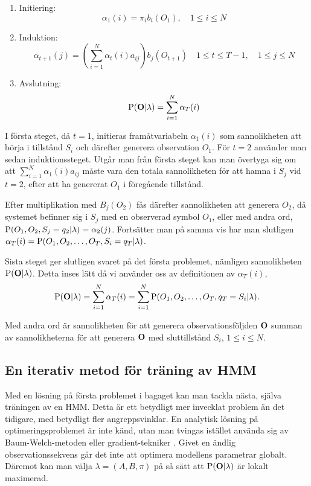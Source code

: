 \documentclass[../rapport_MVEX01-11-05]{subfiles}
\begin{document}
\begin{enumerate}
\item Initiering:
\begin{equation*}
\alpha_1(i) = \pi_ib_i(O_1), \quad 1\leq i \leq N
\end{equation*}

\item Induktion:
\begin{equation*}
\alpha_{t+1}(j) =
\left(\sum_{i=1}^N\alpha_t(i)a_{ij}\right)b_j(O_{t+1}) \quad 1 \leq t \leq T-1,\quad1 \leq j \leq N
\end{equation*}

\item Avslutning:
\begin{equation*}
\mathrm{P}(\mathbf{O}|\lambda) = \sum_{i=1}^N\alpha_T(i)
\end{equation*}
\end{enumerate}

I första steget, då $t=1$, initieras framåtvariabeln $\alpha_1(i)$ som
sannolikheten att börja i tillstånd $S_i$ och därefter generera
observation $O_1$. För $t=2$ använder man sedan induktionssteget. Utgår man
från första steget kan man övertyga sig om att
$\sum_{i=1}^N\alpha_1(i)a_{ij}$ måste vara den totala sannolikheten
för att hamna i $S_j$ vid $t=2$, efter att ha genererat $O_1$ i föregående
tillstånd.

Efter multiplikation med $B_j(O_{2})$ fås därefter
sannolikheten att generera $O_2$, då systemet befinner sig i $S_j$ med
en
observerad symbol $O_1$, eller med andra ord, $\mathrm{P}(O_1,O_2,S_j
= q_2 | \lambda) = \alpha_2(j)$. Fortsätter man på samma vis har man
slutligen $\alpha_T(i) = \mathrm{P}(O_1,O_2,\dots,O_T,S_i = q_T |
\lambda)$.

Sista steget ger slutligen svaret på det första problemet, nämligen
sannolikheten $\mathrm{P}(\mathbf{O}|\lambda)$. Detta inses lätt då vi
använder oss av definitionen av $\alpha_T(i)$, 
\begin{equation*}
\mathrm{P}(\mathbf{O}|\lambda) = \sum_{i=1}^N\alpha_T(i) =
\sum_{i=1}^N\mathrm{P}(O_1,O_2,\dots,O_T,q_T = S_i|\lambda). 
\end{equation*} 

Med andra ord är sannolikheten för att generera observationsföljden
$\mathbf{O}$ summan av sannolikheterna för att generera $\mathbf{O}$ med
sluttillstånd $S_i$, $1 \leq i \leq N$.

\subsection{En iterativ metod för träning av HMM}
Med en lösning på första problemet i bagaget kan man tackla nästa,
själva träningen av en HMM. Detta är ett betydligt mer invecklat
problem än det tidigare, med betydligt fler angreppsvinklar. En
analytisk lösning på optimeringsproblemet är inte känd, utan man
tvingas istället använda sig av Baum-Welch-metoden eller
gradient-tekniker \cite{Dempster77,Levinson83}. 
Givet en ändlig observationssekvens går det inte att optimera
modellens parametrar globalt.
Däremot kan man välja $\lambda = (A,B,\pi)$ på så sätt att $\mathrm{P}(\mathbf{O}|\lambda)$ är lokalt
maximerad. 
\end{document}
